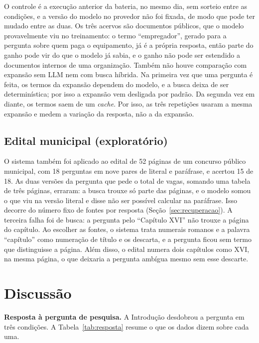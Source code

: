 \documentclass[12pt]{article}
\begin{document}
O controle é a execução anterior da bateria, no mesmo dia, sem sorteio entre as condições, e a versão do modelo no provedor não foi fixada, de modo que pode ter mudado entre as duas. Os três acervos são documentos públicos, que o modelo provavelmente viu no treinamento: o termo ``empregador'', gerado para a pergunta sobre quem paga o equipamento, já é a própria resposta, então parte do ganho pode vir do que o modelo já sabia, e o ganho não pode ser estendido a documentos internos de uma organização. Também não houve comparação com expansão sem LLM nem com busca híbrida. Na primeira vez que uma pergunta é feita, os termos da expansão dependem do modelo, e a busca deixa de ser determinística; por isso a expansão vem desligada por padrão. Da segunda vez em diante, os termos saem de um \emph{cache}. Por isso, as três repetições usaram a mesma expansão e medem a variação da resposta, não a da expansão.

\subsection{Edital municipal (exploratório)}
\label{sec:res-prefeitura}

O sistema também foi aplicado ao edital de 52 páginas de um concurso público municipal, com 18 perguntas em nove pares de literal e paráfrase, e acertou 15 de 18. As duas versões da pergunta que pede o total de vagas, somando uma tabela de três páginas, erraram: a busca trouxe só parte das páginas, e o modelo somou o que viu na versão literal e disse não ser possível calcular na paráfrase. Isso decorre do número fixo de fontes por resposta (Seção~\ref{sec:recuperacao}). A terceira falha foi de busca: a pergunta pelo ``Capítulo XVI'' não trouxe a página do capítulo. Ao escolher as fontes, o sistema trata numerais romanos e a palavra ``capítulo'' como numeração de título e os descarta, e a pergunta ficou sem termo que distinguisse a página. Além disso, o edital numera dois capítulos como XVI, na mesma página, o que deixaria a pergunta ambígua mesmo sem esse descarte.

\section{Discussão}
\label{sec:discussao}

\textbf{Resposta à pergunta de pesquisa.} A Introdução desdobrou a pergunta em três condições. A Tabela~\ref{tab:resposta} resume o que os dados dizem sobre cada uma.
\end{document}
